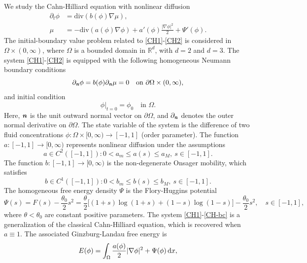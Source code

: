 \documentclass[11pt,reqno]{amsart}
\theoremstyle{remark}
\def\n{\textbf{\textit{n}}}
\def\d{{\rm d}}
\def\div{\mathrm{div}}
\numberwithin{equation}{section}
\def\d{{\rm d}}
\begin{document}
We study the Cahn-Hilliard equation with nonlinear diffusion
\begin{align}
 \label{CH1}
\partial_t \phi &= \div(b(\phi)\nabla \mu),\\
 \label{CH2}
\mu &= -\div( a(\phi) \nabla \phi) + a'(\phi) \frac{|\nabla \phi|^2}{2}+\Psi'(\phi).
\end{align}
The initial-boundary value problem related to \eqref{CH1}-\eqref{CH2} is considered in $\Omega \times (0,\infty)$, where $\Omega$ is a bounded domain in $\mathbb{R}^d$, with $d=2$ and $d=3$. The system  \eqref{CH1}-\eqref{CH2}  is equipped with the following homogeneous Neumann boundary conditions
\begin{equation}
\label{CH-bc}
\partial_\n\phi= b(\phi) \partial_\n \mu=0 \quad \text{on }  \partial \Omega \times (0,\infty),
\end{equation}
and initial condition
\begin{equation}
\label{CH-ic}
 \phi|_{t=0}=\phi_0 \quad \text{in } \Omega.
\end{equation}
Here, $\n$ is the unit outward normal vector on $\partial \Omega$, and
 $\partial_\n$ denotes the outer normal derivative on $\partial \Omega$.
The state variable of the system is the difference of two fluid concentrations $\phi\colon \Omega \times [0,\infty)\to [-1,1]$ (order parameter).
The function $a\colon [-1,1]\to [0,\infty)$ represents nonlinear diffusion under the assumptions
\begin{equation}
a \in C^2([-1,1]): 0 < a_m \le a(s) \le a_M, \ s \in [-1,1].
\label{a-ndeg}
\end{equation}
The function $b\colon [-1,1]\to [0,\infty)$ is the non-degenerate Onsager mobility, which satisfies
\begin{equation}
b \in C^1([-1,1]): 0 < b_m \le b(s) \le b_M, \ s \in [-1,1].
\label{m-ndeg}
\end{equation}
The homogeneous free energy density $\Psi$ is the Flory-Huggins potential
\begin{equation}
\label{Log}
\Psi(s)=F(s)-\frac{\theta_0}{2}s^2=\frac{\theta}{2}\bigg[ (1+s)\log(1+s)+(1-s)\log(1-s)\bigg]-\frac{\theta_0}{2} s^2, \quad s \in [-1,1],
\end{equation}
where $\theta<\theta_0$ are constant positive parameters. The system \eqref{CH1}-\eqref{CH-bc} is a generalization of the classical Cahn-Hilliard equation, which is recovered when $a\equiv 1$.
The associated Ginzburg-Landau free energy is
\begin{equation}
\label{free-energy}
E(\phi) = \int_\Omega \frac{a(\phi)}{2} |\nabla \phi|^2 + \Psi(\phi) \,\d x,
\end{equation}
\end{document}
